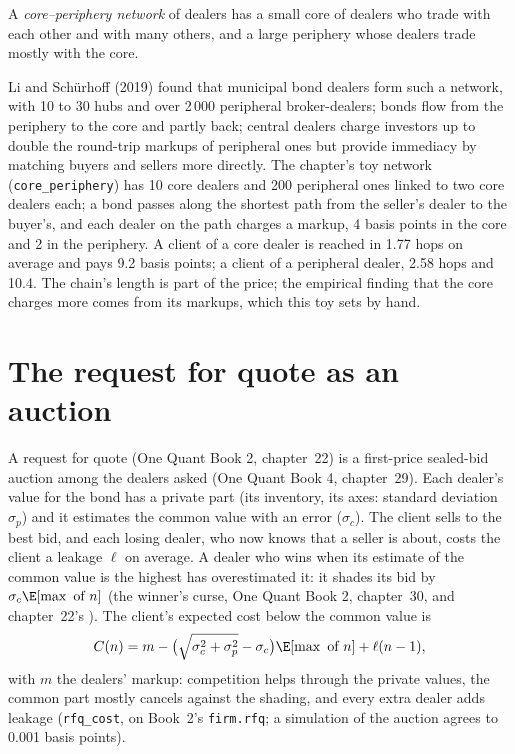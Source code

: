 \begin{definition}\label{def:mx:request-for-quote-and-dealer-markets-in-theory:cp}
A \emph{core--periphery network} of dealers has a small core of dealers who trade with each other and with many others,
and a large periphery whose dealers trade mostly with the core.
\end{definition}

Li and Schürhoff (2019) found that municipal bond dealers form such a network, with 10 to 30 hubs and over 2\,000 peripheral broker-dealers; bonds flow
from the periphery to the core and partly back; central dealers charge investors up to double the round-trip markups of peripheral ones but provide
immediacy by matching buyers and sellers more directly. The chapter's toy network (\texttt{core\_periphery}) has 10 core dealers and 200 peripheral
ones linked to two core dealers each; a bond passes along the shortest path from the seller's dealer to the buyer's, and each dealer on the path
charges a markup, 4 basis points in the core and 2 in the periphery. A client of a core dealer is reached in 1.77 hops on average and pays 9.2 basis
points; a client of a peripheral dealer, 2.58 hops and 10.4. The chain's length is part of the price; the empirical finding that the core charges more
comes from its markups, which this toy sets by hand.

\section{The request for quote as an auction}

A request for quote (One Quant Book 2, chapter~22) is a first-price sealed-bid auction among the dealers asked (One Quant Book 4, chapter~29). Each
dealer's value for the bond has a private part (its inventory, its axes: standard deviation $\sigma_p$) and it estimates the common value with an
error ($\sigma_c$). The client sells to the best bid, and each losing dealer, who now knows that a seller is about, costs the client a leakage $\ell$
on average. A dealer who wins when its estimate of the common value is the highest has overestimated it: it shades its bid by $\sigma_c\E[\max\text{ of
}n]$ (the winner's curse, One Quant Book 2, chapter~30, and chapter~22's ). The client's expected cost below the common value is
\[
C(n)=m-\bigl(\sqrt{\sigma_c^2+\sigma_p^2}-\sigma_c\bigr)\E[\max\text{ of }n]+\ell(n-1),
\]
with $m$ the dealers' markup: competition helps through the private values, the common part mostly cancels against the shading, and every extra dealer
adds leakage (\texttt{rfq\_cost}, on Book~2's \texttt{firm.rfq}; a simulation of the auction agrees to 0.001 basis points).

